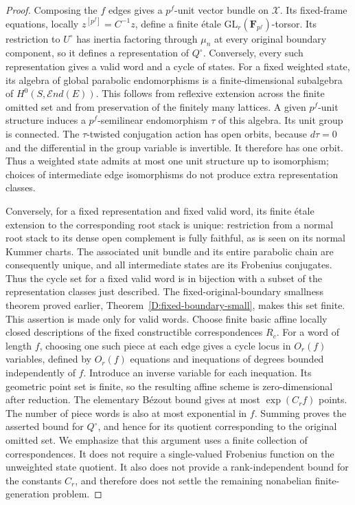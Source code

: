 \begin{proof}
Composing the $f$ edges gives a $p^f$-unit vector bundle on $\mathcal X$. Its fixed-frame equations, locally $z^{[p^f]}=C^{-1}z$, define a finite étale $\mathrm{GL}_r(\mathbf F_{p^f})$-torsor. Its restriction to $U^\circ$ has inertia factoring through $\mu_n$ at every original boundary component, so it defines a representation of $Q^\circ$. Conversely, every such representation gives a valid word and a cycle of states.
For a fixed weighted state, its algebra of global parabolic endomorphisms is a finite-dimensional subalgebra of $H^0(S,\mathcal End(E))$. This follows from reflexive extension across the finite omitted set and from preservation of the finitely many lattices. A given $p^f$-unit structure induces a $p^f$-semilinear endomorphism $\tau$ of this algebra. Its unit group is connected. The $\tau$-twisted conjugation action has open orbits, because $d\tau=0$ and the differential in the group variable is invertible. It therefore has one orbit. Thus a weighted state admits at most one unit structure up to isomorphism; choices of intermediate edge isomorphisms do not produce extra representation classes.

Conversely, for a fixed representation and fixed valid word, its finite étale extension to the corresponding root stack is unique: restriction from a normal root stack to its dense open complement is fully faithful, as is seen on its normal Kummer charts. The associated unit bundle and its entire parabolic chain are consequently unique, and all intermediate states are its Frobenius conjugates. Thus the cycle set for a fixed valid word is in bijection with a subset of the representation classes just described. The fixed-original-boundary smallness theorem proved earlier, Theorem~\ref{D:fixed-boundary-small}, makes this set finite. This assertion is made only for valid words.
Choose finite basic affine locally closed descriptions of the fixed constructible correspondences $R_c$. For a word of length $f$, choosing one such piece at each edge gives a cycle locus in $O_r(f)$ variables, defined by $O_r(f)$ equations and inequations of degrees bounded independently of $f$. Introduce an inverse variable for each inequation. Its geometric point set is finite, so the resulting affine scheme is zero-dimensional after reduction. The elementary Bézout bound gives at most $\exp(C_r f)$ points. The number of piece words is also at most exponential in $f$. Summing proves the asserted bound for $Q^\circ$, and hence for its quotient corresponding to the original omitted set.
We emphasize that this argument uses a finite collection of correspondences. It does not require a single-valued Frobenius function on the unweighted state quotient. It also does not provide a rank-independent bound for the constants $C_r$, and therefore does not settle the remaining nonabelian finite-generation problem.
\end{proof}
